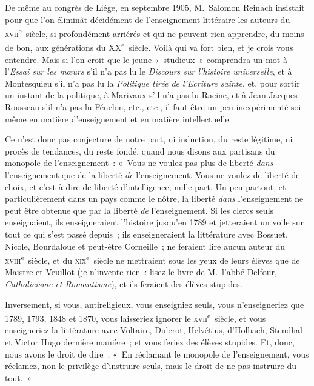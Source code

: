 \documentclass[french,twoside]{book} %
\begin{document}
De même au congrès de Liége, en septembre 1905, M. Salomon Reinach insistait pour que l’on éliminât décidément de l’enseignement littéraire les auteurs du \textsc{xvii}\textsuperscript{e} siècle, si profondément arriérés et qui ne peuvent rien apprendre, du moins de bon, aux générations du \textsc{XX}\textsuperscript{e} siècle. Voilà qui va fort bien, et je crois vous entendre. Mais si l’on croit que le jeune « studieux » comprendra un mot à l’\emph{Essai sur les mœurs} s’il n’a pas lu le \emph{Discours sur l’histoire universelle}, et à Montesquieu s’il n’a pas lu la \emph{Politique tirée de l’Ecriture sainte},  et, pour sortir un instant de la politique, à Marivaux s’il n’a pas lu Racine, et à Jean-Jacques Rousseau s’il n’a pas lu Fénelon, etc., etc., il faut être un peu inexpérimenté soi-même en matière d’enseignement et en matière intellectuelle.\par
Ce n’est donc pas conjecture de notre part, ni induction, du reste légitime, ni procès de tendances, du reste fondé, quand nous disons aux partisans du monopole de l’enseignement : « Vous ne voulez pas plus de liberté {\itshape dans} l’enseignement que de la liberté {\itshape de} l’enseignement. Vous ne voulez de liberté de choix, et c’est-à-dire de liberté d’intelligence, nulle part. Un peu partout, et particulièrement dans un pays comme le nôtre, la liberté {\itshape dans} l’enseignement ne peut être obtenue que par la liberté {\itshape de} l’enseignement. Si les clercs seuls enseignaient, ils enseigneraient l’histoire jusqu’en 1789 et jetteraient un voile sur tout ce qui s’est passé depuis ; ils enseigneraient la littérature avec Bossuet, Nicole, Bourdaloue et peut-être Corneille ; ne feraient lire aucun auteur du \textsc{xviii}\textsuperscript{e} siècle, et du \textsc{xix}\textsuperscript{e} siècle ne mettraient sous les yeux de leurs élèves que de Maistre et Veuillot (je n’invente rien : lisez le livre de M. l’abbé Delfour, \emph{Catholicisme et Romantisme}), et ils feraient des élèves stupides.\par
Inversement, si vous, antireligieux, vous enseigniez  seuls, vous n’enseigneriez que 1789, 1793, 1848 et 1870, vous laisseriez ignorer le \textsc{xvii}\textsuperscript{e} siècle, et vous enseigneriez la littérature avec Voltaire, Diderot, Helvétius, d’Holbach, Stendhal et Victor Hugo dernière manière ; et vous feriez des élèves stupides. Et, donc, nous avons le droit de dire : « En réclamant le monopole de l’enseignement, vous réclamez, non le privilège d’instruire seuls, mais le droit de ne pas instruire du tout. »\par
\end{document}
